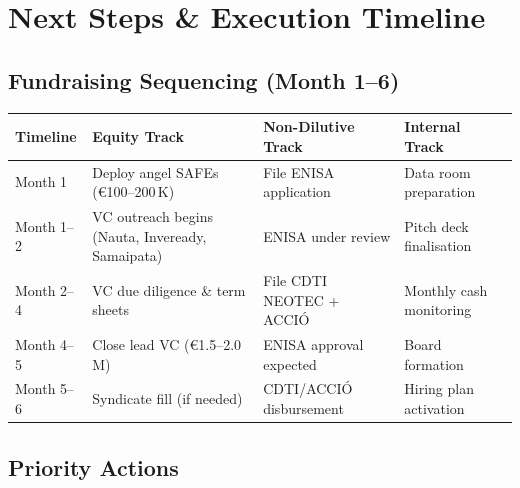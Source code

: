 \documentclass[11pt,a4paper]{article}
\begin{document}
\section{Next Steps \& Execution Timeline}

\subsection{Fundraising Sequencing (Month 1--6)}

\vspace{-2pt}
\noindent
\scriptsize
\begin{tabularx}{\textwidth}{p{1.8cm}XXX}
\toprule
\textbf{Timeline} & \textbf{Equity Track} & \textbf{Non-Dilutive Track} & \textbf{Internal Track} \\
\midrule
Month 1 & Deploy angel SAFEs (\euro{}100--200\,K) & File ENISA application & Data room preparation \\
Month 1--2 & VC outreach begins (Nauta, Inveready, Samaipata) & ENISA under review & Pitch deck finalisation \\
Month 2--4 & VC due diligence \& term sheets & File CDTI NEOTEC + ACCI\'O & Monthly cash monitoring \\
Month 4--5 & Close lead VC (\euro{}1.5--2.0\,M) & ENISA approval expected & Board formation \\
Month 5--6 & Syndicate fill (if needed) & CDTI/ACCI\'O disbursement & Hiring plan activation \\
\bottomrule
\end{tabularx}
\normalsize
\vspace{2pt}

\subsection{Priority Actions}
\end{document}
